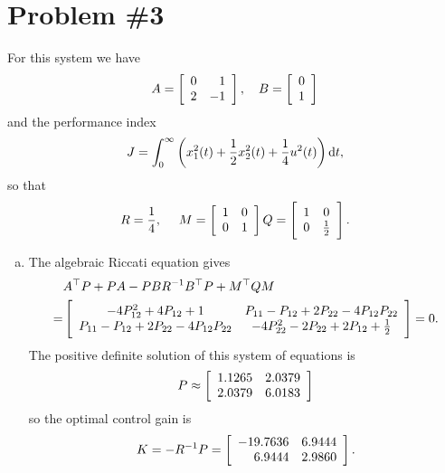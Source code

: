 \documentclass{article}
\begin{document}
\section*{Problem \#3}
For this system we have
$$
A
= \left[\begin{array}{r r}
    0 &  1 \\
    2 & -1
  \end{array}\right], \quad
B
= \left[\begin{array}{c}
    0 \\
    1
  \end{array}\right]
$$
and the performance index
$$
J = \int_0^\infty
      \left(
        x_1^2(t) + \frac{1}{2} x_2^2(t) + \frac{1}{4}u^2(t)
      \right) \dif t,
$$
so that
$$
R = \frac{1}{4}, \quad\
M = \left[\begin{array}{c c}
      1 & 0 \\
      0 & 1
    \end{array}\right]
Q = \left[\begin{array}{c c}
      1 & 0 \\
      0 & \frac{1}{2}
    \end{array}\right].
$$

\begin{enumerate}[(a)]
  \item{
    The algebraic Riccati equation gives
    \begin{align*}
      & A^\top P + P A - P B R^{-1} B^\top P + M^\top Q M \\
    = & \left[\begin{array}{c c}
          -4 P_{12}^2 + 4 P_{12} + 1
        &    P_{11}   -   P_{12} + 2 P_{22} - 4 P_{12} P_{22} \\
             P_{11}   -   P_{12} + 2 P_{22} - 4 P_{12} P_{22}
        & -4 P_{22}^2 - 2 P_{22} + 2 P_{12} + \frac{1}{2}
        \end{array}\right] = 0.
    \end{align*}
    The positive definite solution of this system of equations is
    $$
    P \approx
    \left[\begin{array}{r r}
      1.1265 &  2.0379 \\
      2.0379 &  6.0183
    \end{array}\right]
    $$
    so the optimal control gain is
    $$
    K = -R^{-1} P
    = \left[\begin{array}{r r}
        -19.7636 & 6.9444 \\
          6.9444 & 2.9860
      \end{array}\right].
    $$
  }
\end{enumerate}
\end{document}
